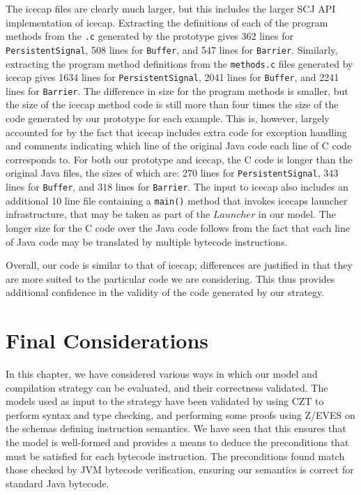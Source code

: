 {The icecap files are clearly much larger, but this includes the larger
SCJ API implementation of icecap.
Extracting the definitions of each of the program methods from the
\texttt{.c} generated by the prototype gives 362 lines for
\texttt{PersistentSignal}, 508 lines for \texttt{Buffer}, and 547
lines for \texttt{Barrier}.
Similarly, extracting the program method definitions from the
\texttt{methods.c} files generated by icecap gives 1634 lines for
\texttt{PersistentSignal}, 2041 lines for \texttt{Buffer}, and 2241
lines for \texttt{Barrier}.
The difference in size for the program methods is smaller, but the
size of the icecap method code is still more than four times the size
of the code generated by our prototype for each example.
This is, however, largely accounted for by the fact that icecap
includes extra code for exception handling and comments indicating
which line of the original Java code each line of C code corresponds
to.
For both our prototype and icecap, the C code is longer than the
original Java files, the sizes of which are: 270 lines for
\texttt{PersistentSignal}, 343 lines for \texttt{Buffer}, and 318
lines for \texttt{Barrier}.
The input to icecap also includes an additional 10 line file
containing a \texttt{main()} method that invokes icecaps launcher
infrastructure, that may be taken as part of the $Launcher$ in our
model.
The longer size for the C code over the Java code follows from the
fact that each line of Java code may be translated by multiple
bytecode instructions.

Overall, our code is similar to that of icecap; differences are
justified in that they are more suited to the particular code we are
considering.
This thus provides additional confidence in the validity of the code
generated by our strategy.
}
\section{Final Considerations}
\label{evaluation-final-considerations-section}

In this chapter, we have considered various ways in which our model
and compilation strategy can be evaluated, and their correctness
validated.
The models used as input to the strategy have been validated by using
CZT to perform syntax and type checking, and performing some proofs
using Z/EVES on the schemas defining instruction semantics.
We have seen that this ensures that the model is well-formed and
provides a means to deduce the preconditions that must be satisfied
for each bytecode instruction.
The preconditions found match those checked by JVM bytecode
verification, ensuring our semantics is correct for standard Java
bytecode.

